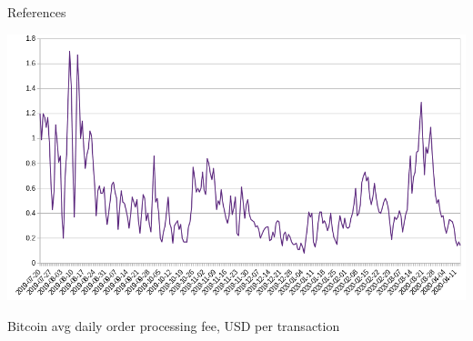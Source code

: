 \documentclass[english,10pt
,aspectratio=169
]{beamer}
\begin{document}
\appendix
\begin{frame}[allowframebreaks]{References}
	
	
\end{frame}


\begin{frame}[label=bcfee]
	\centering
	\includegraphics[width=.8\paperwidth]{pics/bitcoin_orderfee}
	
	Bitcoin avg daily order processing fee, USD per transaction \hyperlink{problems}{}
\end{frame}
\end{document}
